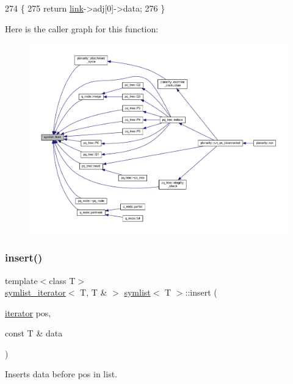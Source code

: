 \begin{DoxyCode}
274     \{
275     \textcolor{keywordflow}{return} \mbox{\hyperlink{classsymlist_a8fa81a7f6d0bb986bb593776db582c90}{link}}->adj[0]->data;
276     \}
\end{DoxyCode}
Here is the caller graph for this function\+:\nopagebreak
\begin{figure}[H]
\begin{center}
\leavevmode
\includegraphics[width=350pt]{classsymlist_afd4b55616fc20033d4a47684551866e8_icgraph}
\end{center}
\end{figure}
\mbox{\label{classsymlist_a8b3327b8a33b180bf1eb802856f755c3}} 
\subsubsection{\texorpdfstring{insert()}{insert()}}
{\footnotesize\ttfamily template$<$class T$>$ \\
\mbox{\hyperlink{structsymlist__iterator}{symlist\+\_\+iterator}}$<$ T, T \& $>$ \mbox{\hyperlink{classsymlist}{symlist}}$<$ T $>$\+::insert (\begin{DoxyParamCaption}\item[{\mbox{\hyperlink{classsymlist_a66045fbe3d98975e5537092ede8b50df}{iterator}}}]{pos,  }\item[{const T \&}]{data }\end{DoxyParamCaption})}



Inserts {\ttfamily data} before {\ttfamily pos} in list. 



